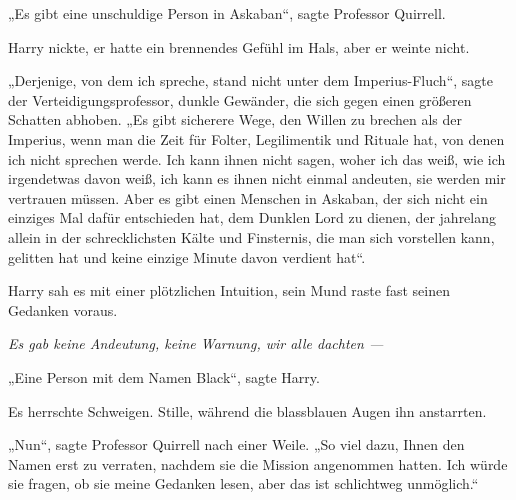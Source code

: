 „Es gibt eine unschuldige Person in Askaban“, sagte Professor Quirrell.

Harry nickte, er hatte ein brennendes Gefühl im Hals, aber er weinte nicht.

„Derjenige, von dem ich spreche, stand nicht unter dem Imperius-Fluch“, sagte der Verteidigungsprofessor, dunkle Gewänder, die sich gegen einen größeren Schatten abhoben.
„Es gibt sicherere Wege, den Willen zu brechen als der Imperius, wenn man die Zeit für Folter, Legilimentik und Rituale hat, von denen ich nicht sprechen werde. Ich kann ihnen nicht sagen, woher ich das weiß, wie ich irgendetwas davon weiß, ich kann es ihnen nicht einmal andeuten, sie werden mir vertrauen müssen. Aber es gibt einen Menschen in Askaban, der sich nicht ein einziges Mal dafür entschieden hat, dem Dunklen Lord zu dienen, der jahrelang allein in der schrecklichsten Kälte und Finsternis, die man sich vorstellen kann, gelitten hat und keine einzige Minute davon verdient hat“.

Harry sah es mit einer plötzlichen Intuition, sein Mund raste fast seinen Gedanken voraus.

\emph{Es gab keine Andeutung, keine Warnung, wir alle dachten —}

„Eine Person mit dem Namen Black“, sagte Harry.

Es herrschte Schweigen. Stille, während die blassblauen Augen ihn anstarrten.

„Nun“, sagte Professor Quirrell nach einer Weile.
„So viel dazu, Ihnen den Namen erst zu verraten, nachdem sie die Mission angenommen hatten. Ich würde sie fragen, ob sie meine Gedanken lesen, aber das ist schlichtweg unmöglich.“

